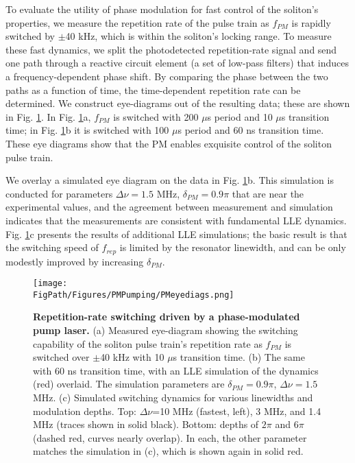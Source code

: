 To evaluate the utility of phase modulation for fast control of the soliton's properties, we measure the repetition rate of the pulse train as $f_{PM}$ is rapidly switched by $\pm$40 kHz, which is within the soliton's locking range.  To measure these fast dynamics, we split the photodetected repetition-rate signal and send one path through a reactive circuit element (a set of low-pass filters) that induces a frequency-dependent phase shift. By comparing the phase between the two paths as a function of time, the time-dependent repetition rate can be determined. We construct eye-diagrams out of the resulting data; these are shown in Fig. \ref{fig:PMeyediags}. In Fig. \ref{fig:PMeyediags}a, $f_{PM}$ is switched with 200 $\mu$s period and 10 $\mu$s transition time; in Fig. \ref{fig:PMeyediags}b it is switched with 100 $\mu$s period and 60 ns transition time. These eye diagrams show that the PM enables exquisite control of the soliton pulse train.

We overlay a simulated eye diagram on the data in Fig. \ref{fig:PMeyediags}b. This simulation is conducted for parameters $\Delta\nu=1.5$ MHz, $\delta_{PM}=0.9\pi$ that are near the experimental values, and the agreement between measurement and simulation indicates that the measurements are consistent with fundamental LLE dynamics. Fig. \ref{fig:PMeyediags}c presents the results of additional LLE simulations; the basic result is that the switching speed of $f_{rep}$ is limited by the resonator linewidth, and can be only modestly improved by increasing $\delta_{PM}$. 

\begin{figure}[htpb]
	\begin{center}
		\texttt{[image: \\FigPath/Figures/PMPumping/PMeyediags.png]}
	\end{center}
	\caption[Repetition-rate switching driven by a phase-modulated pump laser]{\textbf{Repetition-rate switching driven by a phase-modulated pump laser.} (a) Measured eye-diagram showing the switching capability of the soliton pulse train's repetition rate as $f_{PM}$ is switched over $\pm$40 kHz with 10 $\mu$s transition time. (b) The same with 60 ns transition time, with an LLE simulation of the dynamics (red) overlaid. The simulation parameters are $\delta_{PM}=0.9\pi$, $\Delta\nu=1.5$ MHz. (c) Simulated switching dynamics for various linewidths and modulation depths. Top: $\Delta\nu$=10 MHz (fastest, left), 3 MHz, and 1.4 MHz (traces shown in solid black). Bottom: depths of $2\pi$ and $6\pi$ (dashed red, curves nearly overlap). In each, the other parameter matches the simulation in (c), which is shown again in solid red. }
	\label{fig:PMeyediags}
\end{figure} 

